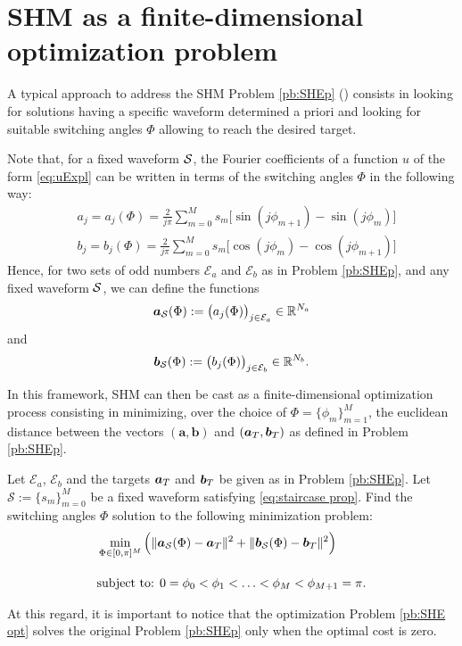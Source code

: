 \documentclass[twocolumn]{autart}    %
\begin{document}
\section{SHM as a finite-dimensional optimization problem}\label{sec:SHE_finite-dim_pbm}

A typical approach to address the SHM Problem \ref{pb:SHEp} (\cite{Yang2015,Konstantinou2010,Sun1996}) consists in looking for solutions having a specific waveform determined a priori and looking for suitable switching angles $\Phi$ allowing to reach the desired target. 

Note that, for a fixed waveform $\mathcal{S}$, the Fourier coefficients of a function $u$ of the form \eqref{eq:uExpl} can be written in terms of the switching angles $\Phi$ in the following way:
\begin{align*}
	& a_j = a_j(\Phi) =  \frac{2}{j\pi} \sum_{m=0}^{M} s_m \Big[\sin(j\phi_{m+1}) -\sin(j\phi_{m})\Big]
	\\[5pt]
	& b_j = b_j(\Phi) = \frac{2}{j\pi} \sum_{m=0}^{M} s_m \Big[\cos(j\phi_{m}) -\cos(j\phi_{m+1})\Big]
\end{align*}
Hence, for two sets of odd numbers $\mathcal{E}_a$ and $\mathcal{E}_b$ as in Problem \ref{pb:SHEp}, and any fixed waveform $\mathcal{S}$, we can define the functions
\begin{align*}
	\bm{a}_{\mathcal{S}} (\Phi) := \big(a_j (\Phi)\big)_{j\in \mathcal{E}_a} \in \mathbb{R}^{N_a}
\end{align*}
and
\begin{align*}
	\bm{b}_{\mathcal{S}} (\Phi) := \big(b_j (\Phi)\big)_{j\in \mathcal{E}_b} \in \mathbb{R}^{N_b}.
\end{align*}

In this framework, SHM can then be cast as a finite-dimensional optimization process consisting in minimizing, over the choice of $\Phi = \{\phi_m\}_{m=1}^{M}$, the euclidean distance between the vectors $(\bm{a}, \bm{b})$ and $(\bm{a}_T,\bm{b}_T)$ as defined in Problem \ref{pb:SHEp}.

\bigskip

\begin{problem}\label{pb:SHE opt}
Let $\mathcal{E}_a$, $\mathcal{E}_b$ and the targets $\bm{a}_T$ and $\bm{b}_T$ be given as in Problem \ref{pb:SHEp}.  Let $\mathcal S := \{ s_m\}_{m=0}^M$ be a fixed waveform satisfying \eqref{eq:staircase prop}.  Find the switching angles $\Phi$ solution to the following minimization problem:
\begin{align}
	&\min_{\Phi \in [0,\pi]^{M}} \Big( \|\bm{a}_{\mathcal{S}} (\Phi) - \bm{a}_T\|^2 + \| \bm{b}_{\mathcal{S}} (\Phi) - \bm{b}_T\|^2\Big)\notag 
	\\[10pt]
	&\mbox{subject to: } 0 = \phi_0 <\phi_1 < \ldots < \phi_{M} < \phi_{M+1} = \pi. \notag 
\end{align}
\end{problem}
\JOStart
At this regard, it is important to notice that the optimization Problem \ref{pb:SHE opt} solves the original Problem \ref{pb:SHEp} only when the optimal cost is zero. 
\end{document}
